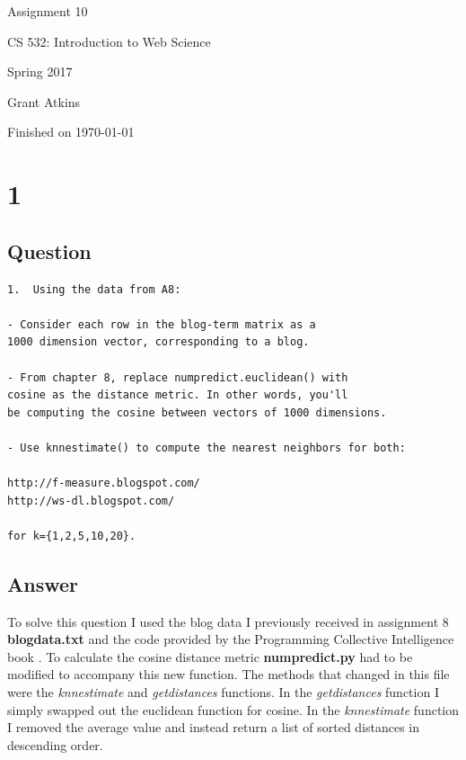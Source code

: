 \documentclass[letterpaper,11pt]{article}
\begin{document}
\begin{titlepage}

\begin{center}

\Huge{Assignment 10}

\Large{CS 532:  Introduction to Web Science}

\Large{Spring 2017}

\Large{Grant Atkins}

\Large Finished on \today

\end{center}

\end{titlepage}

\newpage


\section*{1}

\subsection*{Question}

\begin{verbatim}
1.  Using the data from A8:

- Consider each row in the blog-term matrix as a 
1000 dimension vector, corresponding to a blog.  

- From chapter 8, replace numpredict.euclidean() with 
cosine as the distance metric. In other words, you'll 
be computing the cosine between vectors of 1000 dimensions.  

- Use knnestimate() to compute the nearest neighbors for both:

http://f-measure.blogspot.com/
http://ws-dl.blogspot.com/

for k={1,2,5,10,20}.
\end{verbatim}

\clearpage
\subsection*{Answer}

To solve this question I used the blog data I previously received in assignment 8 \textbf{blogdata.txt} and the code provided by the Programming Collective Intelligence book \cite{collectiveIntell}. To calculate the cosine distance metric \textbf{numpredict.py} had to be modified to accompany this new function. The methods that changed in this file were the \textit{knnestimate} and \textit{getdistances} functions. In the \textit{getdistances} function I simply swapped out the euclidean function for cosine. In the \textit{knnestimate} function I removed the average value and instead return a list of sorted distances in descending order.
\end{document}
